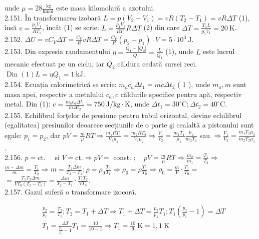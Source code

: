 \documentclass[10pt]{article}
\begin{document}
unde $\mu=28 \frac{\mathrm{~kg}}{\mathrm{kmol}}$ este masa kilomolară a azotului.\\
2.151. În transformarea izobară $L=p\left(V_{2}-V_{1}\right)=v R\left(T_{2}-T_{1}\right)=v R \Delta T$ (1), însă $v=\frac{p_{1} V_{1}}{R T_{1}}$, încât (1) se scrie: $L=\frac{p_{1} V_{1}}{R T_{1}} R \Delta T$ (2) din care $\Delta T=\frac{T_{1} L}{p_{1} V_{1}}=20 \mathrm{~K}$.\\
2.152. $\Delta U=v C_{V} \Delta T=\frac{C_{V}}{R} v R \Delta T=\frac{C_{V}}{R}\left(p_{2}-p_{1}\right) \cdot V=5 \cdot 10^{3} \mathrm{~J}$.\\
2.153. Din expresia randamentului $\eta=\frac{Q_{1}-\left|Q_{2}\right|}{Q_{1}}=\frac{L}{Q_{1}}$ (1), unde $L$ este lucrul mecanic efectuat pe un ciclu, iar $Q_{2}$ căldura cedată sursei reci.\\
$\operatorname{Din}(1) L=\eta Q_{1}=1 \mathrm{~kJ}$.\\
2.154. Ecuația calorimetrică se scrie: $m_{a} c_{a} \Delta t_{1}=m c \Delta t_{2}$ ( 1 ), unde $m_{a}, m$ sunt masa apei, respectiv a metalului $c_{a}, c$ căldurile specifice pentru apă, respectiv metal. Din (1): $c=\frac{m_{a} c_{a} \Delta t_{1}}{m \Delta t_{2}}=750 \mathrm{~J} / \mathrm{kg} \cdot \mathrm{K}$, unde $\Delta t_{1}=30^{\circ} \mathrm{C} ; \Delta t_{2}=40^{\circ} \mathrm{C}$.\\
2.155. Echilibrul forţelor de presiune pentru tubul orizontal, devine echilibrul (egalitatea) presiunilor deoarece secțiunile de o parte şi cealaltă a pistonului sunt egale: $p_{1}=p_{2}$, dar $p V=\frac{m}{\mu} R T \Rightarrow \frac{m_{1} R T_{1}}{V_{1} \mu_{1}}=\frac{m_{2} R T_{2}}{V_{2} \mu_{2}} \Rightarrow \frac{V_{1}}{V_{2}}=\frac{m_{1} T_{1}}{\mu_{1}} \frac{\mu_{2}}{m_{2} T_{2}}$ sau $\Rightarrow \frac{V_{1}}{V_{2}}=\frac{m_{1} T_{1} \mu_{2}}{m_{2} T_{2} \mu_{1}}$.\\
2.156. $p=\mathrm{ct} . \quad$ si $V=\mathrm{ct} . \Rightarrow p V=$ const. $; \quad p V=\frac{m}{\mu} R T \Rightarrow \frac{m_{2}}{m_{1}}=\frac{T_{1}}{T_{2}} \Rightarrow$ $\frac{m-\Delta m}{m}=\frac{T_{1}}{T_{2}} \Rightarrow m=\frac{T_{2} \Delta m}{T_{2}-T_{1}} ; \rho=\rho_{0} \frac{T_{0}}{T_{1}} \Rightarrow \rho_{0}=\rho \frac{T_{1}}{T_{0}} \Rightarrow \rho_{0}=\frac{m}{V} \cdot \frac{T_{1}}{T_{0}}=$ $=\frac{T_{1} T_{2} \Delta m}{V T_{0}\left(T_{2}-T_{1}\right)}=\frac{\Delta m}{T_{2}-T_{1}} \cdot \frac{T_{1} T_{2}}{V T_{0}}$.\\
2.157. Gazul suferă o transformare izocoră.

$$
\begin{aligned}
& \frac{p_{2}}{p_{1}}=\frac{T_{2}}{T_{1}} ; T_{2}=T_{1}+\Delta T \Rightarrow T_{1}+\Delta T=\frac{p_{2}}{p_{1}} T_{1} ; T_{1}\left(\frac{p_{2}}{p_{1}}-1\right)=\Delta T \\
& T_{1}=\frac{\Delta T}{\frac{p_{2}}{p_{1}}-1} T_{1}=\frac{10}{10-1} \Rightarrow T_{1}=\frac{10}{9} \mathrm{~K}=1,1 \mathrm{~K}
\end{aligned}
$$
\end{document}
